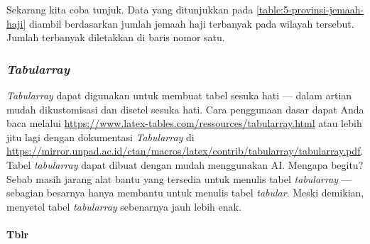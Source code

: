 \begin{enumerate}[label=\alph*.]
    Sekarang kita coba tunjuk. Data yang ditunjukkan pada \autoref{table:5-provinsi-jemaah-haji} diambil berdasarkan jumlah jemaah haji terbanyak pada wilayah tersebut. Jumlah terbanyak diletakkan di baris nomor satu.
\end{enumerate}

\subsubsection{\textit{Tabularray}}

\textit{Tabularray} dapat digunakan untuk membuat tabel sesuka hati --- dalam artian mudah dikustomisasi dan disetel sesuka hati. Cara penggunaan dasar dapat Anda baca melalui \url{https://www.latex-tables.com/ressources/tabularray.html} atau lebih jitu lagi dengan dokumentasi \textit{Tabularray} di \url{https://mirror.unpad.ac.id/ctan/macros/latex/contrib/tabularray/tabularray.pdf}. Tabel \textit{tabularray} dapat dibuat dengan mudah menggunakan AI. Mengapa begitu? Sebab masih jarang alat bantu yang tersedia untuk menulis tabel \textit{tabularray} --- sebagian besarnya hanya membantu untuk menulis tabel \textit{tabular}. Meski demikian, menyetel tabel \textit{tabularray} sebenarnya jauh lebih enak.

\paragraph{Tblr}

